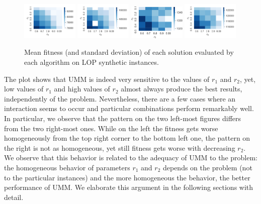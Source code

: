 \documentclass[runningheads]{llncs}
\begin{document}
\begin{figure}[htb]
  \centering%
  \includegraphics[width=0.24\textwidth]{../img/heatmap_N-t1d100_01}
  \includegraphics[width=0.24\textwidth]{../img/heatmap_N-t1d150_01}
  \includegraphics[width=0.24\textwidth]{../img/heatmap_rec05}
  \includegraphics[width=0.24\textwidth]{../img/heatmap_kra32_dat}
    \caption{Mean fitness  (and standard deviation)  of each solution evaluated by each algorithm on LOP synthetic instances.\label{fig:heatmaps}}
\end{figure}

The plot shows that UMM is indeed very sensitive to the values of $r_1$ and
$r_2$, yet, low values of $r_1$ and high values of $r_2$ almost always produce
the best results, independently of the problem. Nevertheless, there are a few
cases where an interaction seems to occur and particular combinations perform
remarkably well.  In particular, we observe that the pattern on
the two left-most figures differs from the two right-most ones. While on the
left the fitness gets worse homogeneously from the top right corner to the
bottom left one, the pattern on the right is not as homogeneous, yet still
fitness gets worse with decreasing $r_2$.  We observe that this behavior is
related to the adequacy of UMM to the problem: the homogeneous behavior of
parameters $r_1$ and $r_2$ depends on the problem (not to the particular
instances) and the more homogeneous the behavior, the better performance of
UMM. We elaborate this argument in the following sections with detail.
\end{document}
